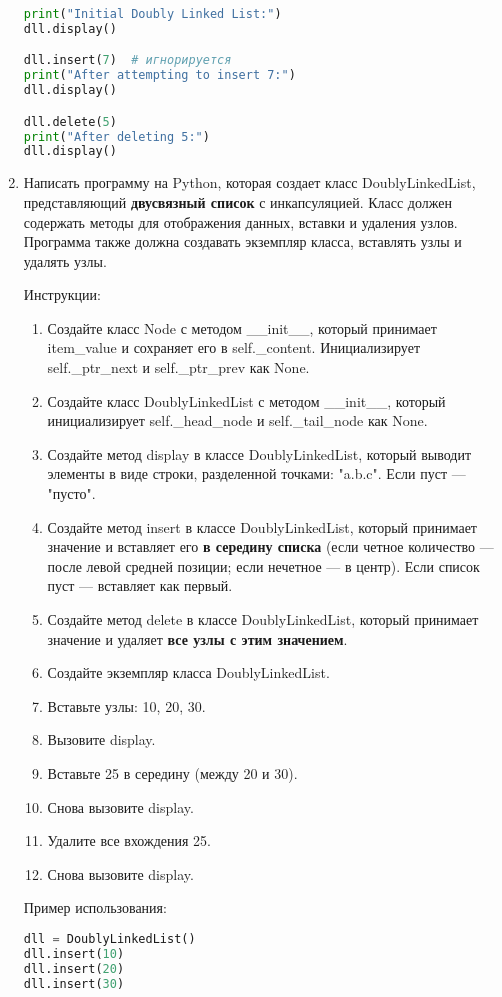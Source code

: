 \begin{enumerate}
\begin{lstlisting}[language=Python]
print("Initial Doubly Linked List:")
dll.display()

dll.insert(7)  # игнорируется
print("After attempting to insert 7:")
dll.display()

dll.delete(5)
print("After deleting 5:")
dll.display()
\end{lstlisting}

\item Написать программу на Python, которая создает класс DoublyLinkedList, представляющий \textbf{двусвязный список} с инкапсуляцией. Класс должен содержать методы для отображения данных, вставки и удаления узлов. Программа также должна создавать экземпляр класса, вставлять узлы и удалять узлы.

Инструкции:
\begin{enumerate}
    \item Создайте класс Node с методом \_\_init\_\_, который принимает item\_value и сохраняет его в self.\_content. Инициализирует self.\_ptr\_next и self.\_ptr\_prev как None.
    \item Создайте класс DoublyLinkedList с методом \_\_init\_\_, который инициализирует self.\_head\_node и self.\_tail\_node как None.
    \item Создайте метод display в классе DoublyLinkedList, который выводит элементы в виде строки, разделенной точками: "a.b.c". Если пуст — "пусто".
    \item Создайте метод insert в классе DoublyLinkedList, который принимает значение и вставляет его \textbf{в середину списка} (если четное количество — после левой средней позиции; если нечетное — в центр). Если список пуст — вставляет как первый.
    \item Создайте метод delete в классе DoublyLinkedList, который принимает значение и удаляет \textbf{все узлы с этим значением}.
    \item Создайте экземпляр класса DoublyLinkedList.
    \item Вставьте узлы: 10, 20, 30.
    \item Вызовите display.
    \item Вставьте 25 в середину (между 20 и 30).
    \item Снова вызовите display.
    \item Удалите все вхождения 25.
    \item Снова вызовите display.
\end{enumerate}

Пример использования:
\begin{lstlisting}[language=Python]
dll = DoublyLinkedList()
dll.insert(10)
dll.insert(20)
dll.insert(30)


\end{lstlisting}
\end{enumerate}
